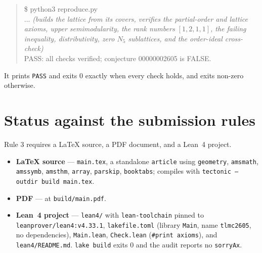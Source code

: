 \documentclass[11pt]{article}
\theoremstyle{definition}
\theoremstyle{remark}
\begin{document}
\begin{quote}\ttfamily\raggedright
\$ python3 reproduce.py\\
... \textit{(builds the lattice from its covers, verifies the partial-order and
lattice axioms, upper semimodularity, the rank numbers $[1,2,1,1]$, the failing
inequality, distributivity, zero $N_5$ sublattices, and the order-ideal
cross-check)}\\
PASS: all checks verified; conjecture 00000002605 is FALSE.
\end{quote}

It prints \texttt{PASS} and exits $0$ exactly when every check holds, and exits
non-zero otherwise.

\section*{Status against the submission rules}

Rule 3 requires a LaTeX source, a PDF document, and a Lean~4 project.

\begin{itemize}
\item \textbf{LaTeX source} --- \texttt{main.tex}, a standalone \texttt{article}
  using \texttt{geometry}, \texttt{amsmath}, \texttt{amssymb}, \texttt{amsthm},
  \texttt{array}, \texttt{parskip}, \texttt{booktabs}; compiles with
  \texttt{tectonic --outdir build main.tex}.
\item \textbf{PDF} --- at \texttt{build/main.pdf}.
\item \textbf{Lean~4 project} --- \texttt{lean4/} with \texttt{lean-toolchain}
  pinned to \texttt{leanprover/lean4:v4.33.1}, \texttt{lakefile.toml}
  (library \texttt{Main}, name \texttt{tlmc2605}, no dependencies),
  \texttt{Main.lean}, \texttt{Check.lean} (\texttt{\#print axioms}), and
  \texttt{lean4/README.md}. \texttt{lake build} exits $0$ and the audit reports
  no \texttt{sorryAx}.
\end{itemize}
\end{document}
